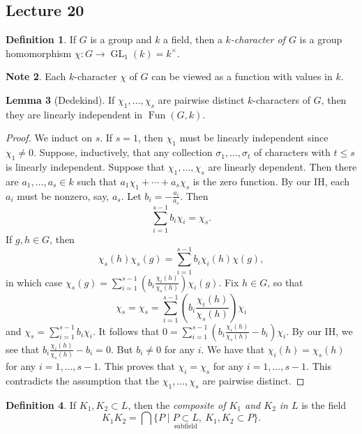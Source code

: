 \documentclass[10pt,letterpaper,cm]{nupset}
\theoremstyle{definition}
\newtheorem{definition}{Definition}[subsection]
\newtheorem{note}[definition]{Note}
\theoremstyle{theorem}
\newtheorem{lemma}[definition]{Lemma}
\theoremstyle{remark}
\newcommand{\1}{\mathbf{1}}
\newcommand{\0}{\vec 0}
\DeclareMathOperator*{\GL}{GL}
\DeclareMathOperator{\Fun}{Fun}
\begin{document}
\subsection{Lecture 20}

\begin{definition}
If $G$ is a group and $k$ a field, then a \textit{$k$-character of $G$} is a group homomorphism $\chi : G \to \GL_1(k) =k^{\times}$.
\end{definition}

\begin{note}
Each $k$-character $\chi$ of $G$ can be viewed as a function with values in $k$.
\end{note}

\begin{lemma}[Dedekind]
If $\chi_1, \ldots, \chi_s$ are pairwise distinct $k$-characters of $G$, then they are linearly independent in $\Fun(G, k)$.
\end{lemma}
\begin{proof}
We induct on $s$. If $s=1$, then $\chi_1$ must be linearly independent since $\chi_1 \ne 0$. Suppose, inductively, that any collection $\sigma_1, \ldots, \sigma_t$ of characters with $t\leq s$ is linearly independent. Suppose that $\chi_1, \ldots, \chi_s$ are linearly dependent. Then there are $a_1, \ldots, a_s\in k$ such that $a_1\chi_1 + \cdots + a_s\chi_s$ is the zero function. By our IH, each $a_i$ must be nonzero, say, $a_s$. Let $b_i = {-}\frac{a_i}{a_s}$. Then $$\sum_{i=1}^{s-1} b_i\chi_i  = \chi_s.$$  If $g,h \in G$, then $$  \chi_s(h)\chi_s(g) = \sum_{i=1}^{s-1} b_i\chi_i(h)\chi(g)   ,$$ in which case $\chi_s(g)  = \sum_{i=1}^{s-1} (b_i \frac{\chi_i(h)}{\chi_s(h)})\chi_i(g) .$ Fix $h\in G$, so that $$\chi_s = \chi_s  = \sum_{i=1}^{s-1} (b_i \frac{\chi_i(h)}{\chi_s(h)})\chi_i $$ and $\chi_s = \sum_{i=1}^{s-1} b_i \chi_i$. It follows that $0 =   \sum_{i=1}^{s-1} (b_i \frac{\chi_i(h)}{\chi_s(h)} -b_i)\chi_i$. By our IH, we see that $b_i \frac{\chi_i(h)}{\chi_s(h)} - b_i =0$. But $b_i \ne 0$ for any $i$. We have that $\chi_i(h) = \chi_s(h)$ for any $i=1, \ldots, s-1$. This proves that $\chi_i = \chi_s$ for any $i=1, \ldots, s-1$. This contradicts the assumption that the $\chi_1, \ldots, \chi_s$ are pairwise distinct. 
\end{proof}

\begin{definition}
If $K_1, K_2 \subset L$, then the \textit{composite of $K_1$ and $K_2$ in $L$} is the field  $$ K_1K_2 = \bigcap \{P \mid  \underset{\text{subfield}}{P\subset L}, \ K_1, K_2 \subset P\}  .$$ 
\end{definition}
\end{document}
